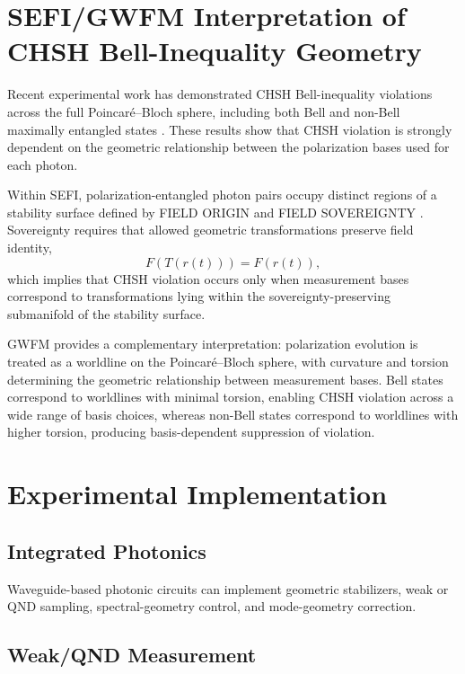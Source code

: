 \documentclass[aip, adv, reprint, superscriptaddress]{revtex4-2}
\begin{document}
\section{SEFI/GWFM Interpretation of CHSH Bell-Inequality Geometry}

Recent experimental work has demonstrated CHSH Bell-inequality violations across the 
full Poincar\'e--Bloch sphere, including both Bell and non-Bell maximally entangled 
states \cite{CardosoIsidoro2026}. These results show that CHSH violation is strongly 
dependent on the geometric relationship between the polarization bases used for each 
photon.

Within SEFI, polarization-entangled photon pairs occupy distinct regions of a stability 
surface defined by FIELD ORIGIN and FIELD SOVEREIGNTY \cite{DuttonSEFI}. 
Sovereignty requires that allowed geometric transformations preserve field identity,
\begin{equation}
F(T(r(t))) = F(r(t)),
\end{equation}
which implies that CHSH violation occurs only when measurement bases correspond to 
transformations lying within the sovereignty-preserving submanifold of the stability 
surface.

GWFM provides a complementary interpretation: polarization evolution is treated as a 
worldline on the Poincar\'e--Bloch sphere, with curvature and torsion determining the 
geometric relationship between measurement bases. Bell states correspond to worldlines 
with minimal torsion, enabling CHSH violation across a wide range of basis choices, 
whereas non-Bell states correspond to worldlines with higher torsion, producing 
basis-dependent suppression of violation.

\section{Experimental Implementation}

\subsection{Integrated Photonics}

Waveguide-based photonic circuits can implement geometric stabilizers, weak or QND 
sampling, spectral-geometry control, and mode-geometry correction.

\subsection{Weak/QND Measurement}
\end{document}
